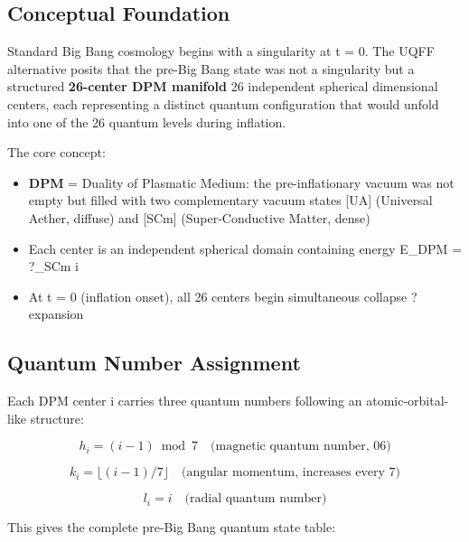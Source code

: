 \documentclass[12pt,a4paper]{article}
\begin{document}
\subsection{Conceptual Foundation}

Standard Big Bang cosmology begins with a singularity at t = 0. The UQFF alternative posits that the pre-Big Bang state was not a singularity but a structured \textbf{26-center DPM manifold}  26 independent spherical dimensional centers, each representing a distinct quantum configuration that would unfold into one of the 26 quantum levels during inflation.

The core concept:

\begin{itemize}
  \item \textbf{DPM} = Duality of Plasmatic Medium: the pre-inflationary vacuum was not empty but filled with two complementary vacuum states  [UA] (Universal Aether, diffuse) and [SCm] (Super-Conductive Matter, dense)
  \item Each center is an independent spherical domain containing energy E\_DPM = ?\_SCm  i
  \item At t = 0 (inflation onset), all 26 centers begin simultaneous collapse ? expansion
\end{itemize}

\subsection{Quantum Number Assignment}

Each DPM center i carries three quantum numbers following an atomic-orbital-like structure:

\begin{equation}
h_i = (i-1) \bmod 7 \quad \text{(magnetic quantum number, 06)}
\end{equation}

\begin{equation}
k_i = \lfloor (i-1)/7 \rfloor \quad \text{(angular momentum, increases every 7)}
\end{equation}

\begin{equation}
l_i = i \quad \text{(radial quantum number)}
\end{equation}

This gives the complete pre-Big Bang quantum state table:
\end{document}
